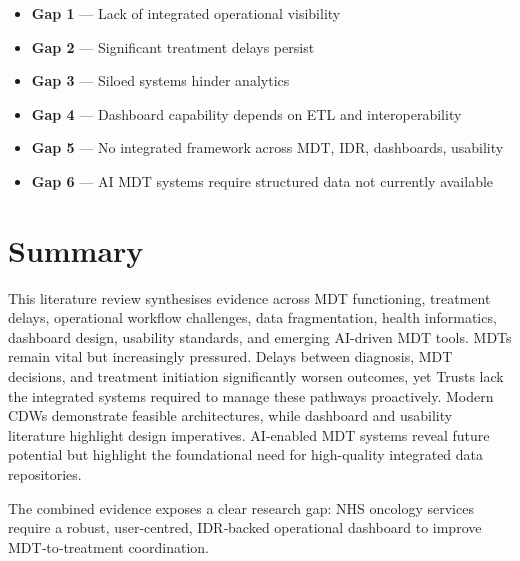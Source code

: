\begin{itemize}
    \item \textbf{Gap 1} — Lack of integrated operational visibility
    \item \textbf{Gap 2} — Significant treatment delays persist
    \item \textbf{Gap 3} — Siloed systems hinder analytics
    \item \textbf{Gap 4} — Dashboard capability depends on ETL and interoperability
    \item \textbf{Gap 5} — No integrated framework across MDT, IDR, dashboards, usability
    \item \textbf{Gap 6} — AI MDT systems require structured data not currently available
\end{itemize}

\section{Summary}

This literature review synthesises evidence across MDT functioning, treatment delays, operational workflow challenges, data fragmentation, health informatics, dashboard design, usability standards, and emerging AI-driven MDT tools. MDTs remain vital but increasingly pressured. Delays between diagnosis, MDT decisions, and treatment initiation significantly worsen outcomes, yet Trusts lack the integrated systems required to manage these pathways proactively. Modern CDWs demonstrate feasible architectures, while dashboard and usability literature highlight design imperatives. AI‑enabled MDT systems reveal future potential but highlight the foundational need for high-quality integrated data repositories.

The combined evidence exposes a clear research gap: NHS oncology services require a robust, user-centred, IDR‑backed operational dashboard to improve MDT‑to‑treatment coordination.